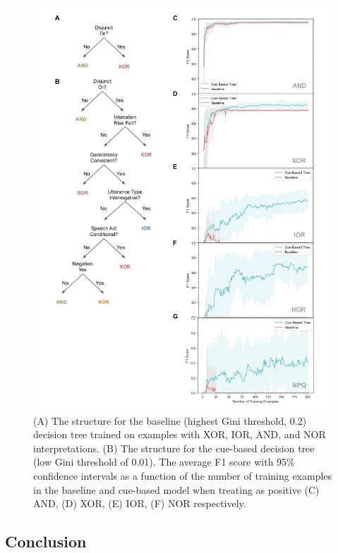 \documentclass[
  english,
  ,man,floatsintext]{apa6}
\begin{document}
\begin{figure}
\centering
\includegraphics{figs/wholeFigure-1.pdf}
\caption{\label{fig:wholeFigure}(A) The structure for the baseline (highest Gini threshold, 0.2) decision tree trained on examples with XOR, IOR, AND, and NOR interpretations. (B) The structure for the cue-based decision tree (low Gini threshold of 0.01). The average F1 score with 95\% confidence intervals as a function of the number of training examples in the baseline and cue-based model when treating as positive (C) AND, (D) XOR, (E) IOR, (F) NOR respectively.}
\end{figure}

\hypertarget{conclusion-1}{%
\subsection{Conclusion}\label{conclusion-1}}
\end{document}
